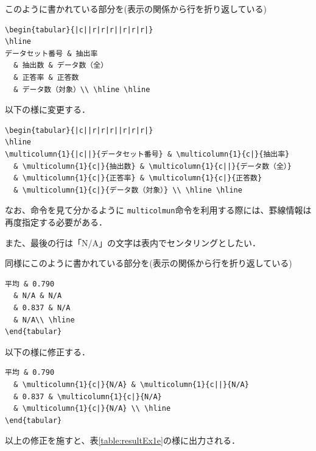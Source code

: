 このように書かれている部分を(表示の関係から行を折り返している)
\begin{breakbox}
{\small
\begin{verbatim}
\begin{tabular}{|c||r|r|r||r|r|r|}
\hline
データセット番号 & 抽出率
  & 抽出数 & データ数（全）
  & 正答率 & 正答数
  & データ数（対象）\\ \hline \hline
\end{verbatim}
}
\end{breakbox}
以下の様に変更する．
\begin{breakbox}
{\small
\begin{verbatim}
\begin{tabular}{|c||r|r|r||r|r|r|}
\hline
\multicolumn{1}{|c||}{データセット番号} & \multicolumn{1}{c|}{抽出率}
  & \multicolumn{1}{c|}{抽出数} & \multicolumn{1}{c||}{データ数（全）}
  & \multicolumn{1}{c|}{正答率} & \multicolumn{1}{c|}{正答数}
  & \multicolumn{1}{c|}{データ数（対象）} \\ \hline \hline
\end{verbatim}
}
\end{breakbox}

なお、命令を見て分かるように \verb+multicolmun+命令を利用する際には、罫線情報は再度指定する必要がある．

また、最後の行は「N/A」の文字は表内でセンタリングとしたい．

同様にこのように書かれている部分を(表示の関係から行を折り返している)
\begin{breakbox}
{\small
\begin{verbatim}
平均 & 0.790
  & N/A & N/A
  & 0.837 & N/A
  & N/A\\ \hline
\end{tabular}
\end{verbatim}
}
\end{breakbox}
以下の様に修正する．
\begin{breakbox}
{\small
\begin{verbatim}
平均 & 0.790
  & \multicolumn{1}{c|}{N/A} & \multicolumn{1}{c||}{N/A}
  & 0.837 & \multicolumn{1}{c|}{N/A}
  & \multicolumn{1}{c|}{N/A} \\ \hline
\end{tabular}
\end{verbatim}
}
\end{breakbox}

以上の修正を施すと、表\ref{table:resultEx1e}の様に出力される．

